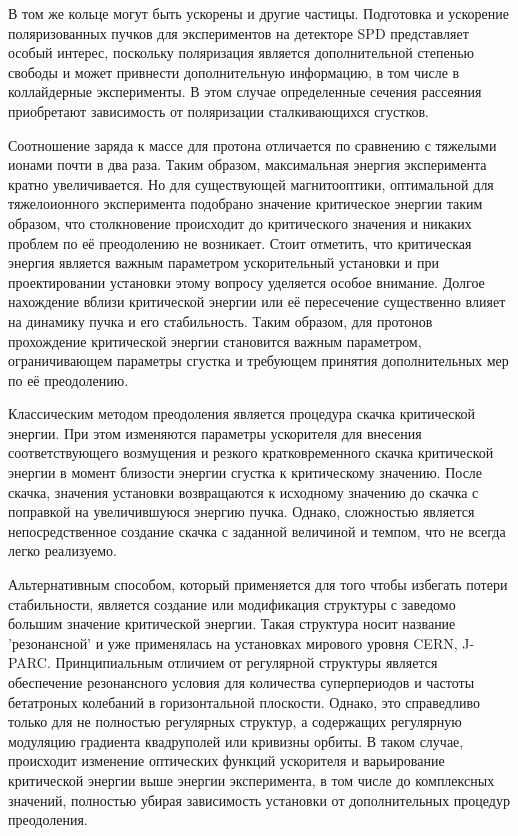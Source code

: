\par В том же кольце могут быть ускорены и другие частицы. Подготовка и ускорение поляризованных пучков для экспериментов на детекторе SPD представляет особый интерес, поскольку поляризация является дополнительной степенью свободы и может привнести дополнительную информацию, в том числе в коллайдерные эксперименты. В этом случае определенные сечения рассеяния приобретают зависимость от поляризации сталкивающихся сгустков.

\par Соотношение заряда к массе для протона отличается по сравнению с тяжелыми ионами почти в два раза. Таким образом, максимальная энергия эксперимента кратно увеличивается. Но для существующей магнитооптики, оптимальной для тяжелоионного эксперимента подобрано значение критическое энергии таким образом, что столкновение происходит до критического значения и никаких проблем по её преодолению не возникает. Стоит отметить, что критическая энергия является важным параметром ускорительный установки и при проектировании установки этому вопросу уделяется особое внимание. Долгое нахождение вблизи критической энергии или её пересечение существенно влияет на динамику пучка и его стабильность. Таким образом, для протонов прохождение критической энергии становится важным параметром, ограничивающем параметры сгустка и требующем принятия дополнительных мер по её преодолению.

\par Классическим методом преодоления является процедура скачка критической энергии. При этом изменяются параметры ускорителя для внесения соответствующего возмущения и резкого кратковременного скачка критической энергии в момент близости энергии сгустка к критическому значению. После скачка, значения установки возвращаются к исходному значению до скачка с поправкой на увеличившуюся энергию пучка. Однако, сложностью является непосредственное создание скачка с заданной величиной и темпом, что не всегда легко реализуемо.

\par Альтернативным способом, который применяется для того чтобы избегать потери стабильности, является создание или модификация структуры с заведомо большим значение критической энергии. Такая структура носит название 'резонансной' и уже применялась на установках мирового уровня CERN, J-PARC. Принципиальным отличием от регулярной структуры является обеспечение резонансного условия для количества суперпериодов и частоты бетатроных колебаний в горизонтальной плоскости. Однако, это справедливо только для не полностью регулярных структур, а содержащих регулярную модуляцию градиента квадруполей или кривизны орбиты. В таком случае, происходит изменение оптических функций ускорителя и варьирование критической энергии выше энергии эксперимента, в том числе до комплексных значений, полностью убирая зависимость установки от дополнительных процедур преодоления.


